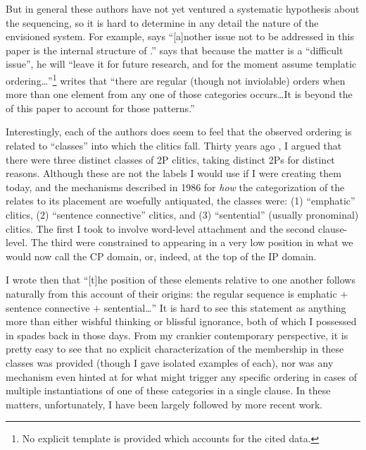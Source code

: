 \documentclass[output=paper,
modfonts
]{LSP/langsci}
\begin{document}
But in general these authors have not yet ventured a systematic hypothesis about
the sequencing, so it is hard to determine in any detail the nature of the envisioned system.
For example, \citet[108, fn.\ 3]{keydana2011} says ``[a]nother issue not to be
addressed in this paper is the internal structure of .'' \citet[88]{goldstein2016} says that because
the matter is a ``difficult issue'', he will ``leave it for future research, and for
the moment assume templatic ordering\ldots ''\footnote{No explicit template is provided which accounts
for the cited data.} \citet[28]{lowe2014}
writes that ``there are regular (though not inviolable) orders when more than one element from
any one of those categories occurs\ldots It is beyond the  of this paper to account for
those patterns.''

Interestingly, each of the authors does seem to feel that the observed ordering is
related to ``classes'' into which the clitics fall. Thirty years ago \citep[73]{hale1987}, I argued that
there were three distinct classes of 2P clitics, taking distinct 2Ps for distinct reasons. 
Although these are not the labels I would use if I were creating them today, and the mechanisms described in 1986
for \textit{how} the categorization of the  relates to its placement are woefully antiquated,
the classes were: (1) ``emphatic'' clitics, (2) ``sentence connective'' clitics, and (3) ``sentential''
(usually pronominal) clitics. The first I took to involve word-level attachment and the second clause-level. The third
were constrained to appearing in a very low position in what we would now call the CP domain, or,
indeed, at the top of the IP domain. 

I wrote then that ``[t]he position of these elements relative to one
another follows naturally from this account of their origins: the regular sequence is emphatic $+$ 
sentence connective $+$ sentential\ldots '' It is hard to see this statement as anything more than 
either wishful thinking or blissful ignorance, both of which I possessed in spades back in those
days. From my crankier contemporary perspective, it is pretty easy to see that no explicit 
characterization of the membership in
these classes was provided (though I gave isolated examples of each), nor was any mechanism even 
hinted at for what might trigger any
specific ordering in cases of multiple instantiations of one of these categories in a single
clause. In these matters, unfortunately,
I have been largely followed by more recent work. 
\end{document}
